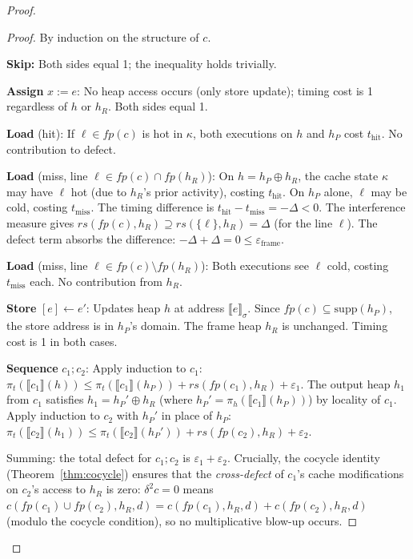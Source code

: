 \documentclass[acmsmall,sigplan,anonymous,review,screen]{acmart}
\theoremstyle{plain}
\theoremstyle{definition}
\newcommand{\rs}{\mathit{rs}}
\newcommand{\fp}{\mathit{fp}}
\newcommand{\defect}{\varepsilon}
\begin{document}
\begin{proof}
\begin{proof}
  By induction on the structure of $c$.

  \textbf{Skip:} Both sides equal 1; the inequality holds trivially.

  \textbf{Assign} $x := e$: No heap access occurs (only store update);
  timing cost is 1 regardless of $h$ or $h_R$.  Both sides equal 1.

  \textbf{Load} (hit): If $\ell \in \fp(c)$ is hot in $\kappa$, both
  executions on $h$ and $h_P$ cost $t_{\mathrm{hit}}$.  No contribution to defect.

  \textbf{Load} (miss, line $\ell \in \fp(c) \cap \fp(h_R)$):
  On $h = h_P \oplus h_R$, the cache state $\kappa$ may have $\ell$
  hot (due to $h_R$'s prior activity), costing $t_{\mathrm{hit}}$.
  On $h_P$ alone, $\ell$ may be cold, costing $t_{\mathrm{miss}}$.
  The timing difference is $t_{\mathrm{hit}} - t_{\mathrm{miss}} = -\Delta < 0$.
  The interference measure gives $\rs(\fp(c), h_R) \supseteq \rs(\{\ell\}, h_R)
  = \Delta$ (for the line $\ell$).  The defect term absorbs the difference:
  $-\Delta + \Delta = 0 \leq \defect_{\mathrm{frame}}$.

  \textbf{Load} (miss, line $\ell \in \fp(c) \setminus \fp(h_R)$):
  Both executions see $\ell$ cold, costing $t_{\mathrm{miss}}$ each.
  No contribution from $h_R$.

  \textbf{Store} $[e] \leftarrow e'$: Updates heap $h$ at address $\llbracket e \rrbracket_\sigma$.
  Since $\fp(c) \subseteq \mathrm{supp}(h_P)$, the store address is in $h_P$'s
  domain.  The frame heap $h_R$ is unchanged.  Timing cost is 1 in both cases.

  \textbf{Sequence} $c_1 ; c_2$:
  Apply induction to $c_1$: $\pi_t(\llbracket c_1 \rrbracket(h)) \leq
  \pi_t(\llbracket c_1 \rrbracket(h_P)) + \rs(\fp(c_1), h_R) + \defect_1$.
  The output heap $h_1$ from $c_1$ satisfies $h_1 = h_P' \oplus h_R$
  (where $h_P' = \pi_h(\llbracket c_1 \rrbracket(h_P))$) by locality of $c_1$.
  Apply induction to $c_2$ with $h_P'$ in place of $h_P$:
  $\pi_t(\llbracket c_2 \rrbracket(h_1)) \leq
  \pi_t(\llbracket c_2 \rrbracket(h_P')) + \rs(\fp(c_2), h_R) + \defect_2$.

  Summing: the total defect for $c_1;c_2$ is $\defect_1 + \defect_2$.
  Crucially, the cocycle identity (Theorem~\ref{thm:cocycle}) ensures that
  the \emph{cross-defect} of $c_1$'s cache modifications on $c_2$'s access
  to $h_R$ is zero: $\delta^2 c = 0$ means
  $c(\fp(c_1) \cup \fp(c_2), h_R, d) = c(\fp(c_1), h_R, d) + c(\fp(c_2), h_R, d)$
  (modulo the cocycle condition), so no multiplicative blow-up occurs.


\end{proof}
\end{proof}
\end{document}
